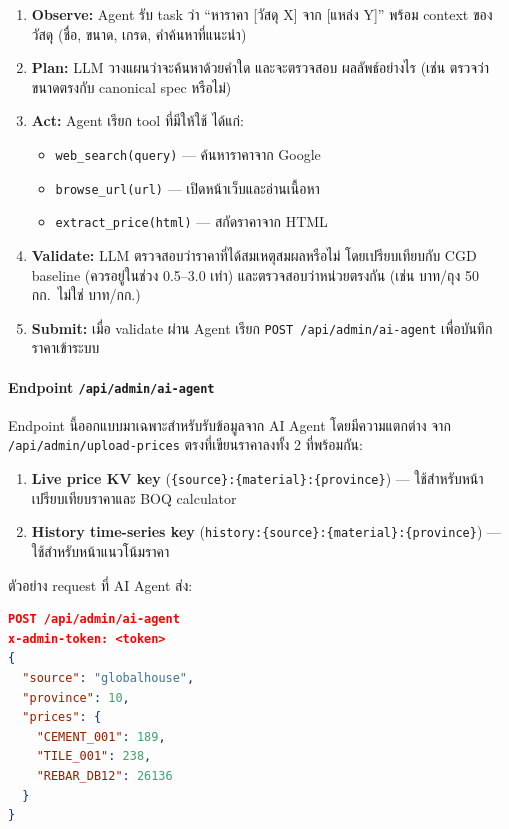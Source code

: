 \begin{enumerate}[leftmargin=2em,itemsep=0.3em]
  \item \textbf{Observe:} Agent รับ task ว่า ``หาราคา [วัสดุ X] จาก
        [แหล่ง Y]'' พร้อม context ของวัสดุ (ชื่อ, ขนาด, เกรด,
        คำค้นหาที่แนะนำ)
  \item \textbf{Plan:} LLM วางแผนว่าจะค้นหาด้วยคำใด และจะตรวจสอบ
        ผลลัพธ์อย่างไร (เช่น ตรวจว่าขนาดตรงกับ canonical spec หรือไม่)
  \item \textbf{Act:} Agent เรียก tool ที่มีให้ใช้ ได้แก่:
        \begin{itemize}[leftmargin=1.5em]
          \item \texttt{web\_search(query)} — ค้นหาราคาจาก Google
          \item \texttt{browse\_url(url)} — เปิดหน้าเว็บและอ่านเนื้อหา
          \item \texttt{extract\_price(html)} — สกัดราคาจาก HTML
        \end{itemize}
  \item \textbf{Validate:} LLM ตรวจสอบว่าราคาที่ได้สมเหตุสมผลหรือไม่
        โดยเปรียบเทียบกับ CGD baseline (ควรอยู่ในช่วง 0.5--3.0 เท่า)
        และตรวจสอบว่าหน่วยตรงกัน (เช่น บาท/ถุง 50 กก.\ ไม่ใช่ บาท/กก.)
  \item \textbf{Submit:} เมื่อ validate ผ่าน Agent เรียก
        \texttt{POST /api/admin/ai-agent} เพื่อบันทึกราคาเข้าระบบ
\end{enumerate}

\paragraph{Endpoint \texttt{/api/admin/ai-agent}}

Endpoint นี้ออกแบบมาเฉพาะสำหรับรับข้อมูลจาก AI Agent โดยมีความแตกต่าง
จาก \texttt{/api/admin/upload-prices} ตรงที่เขียนราคาลงทั้ง 2 ที่พร้อมกัน:

\begin{enumerate}[leftmargin=2em,itemsep=0.2em]
  \item \textbf{Live price KV key} (\texttt{\{source\}:\{material\}:\{province\}})
        — ใช้สำหรับหน้าเปรียบเทียบราคาและ BOQ calculator
  \item \textbf{History time-series key} (\texttt{history:\{source\}:\{material\}:\{province\}})
        — ใช้สำหรับหน้าแนวโน้มราคา
\end{enumerate}

ตัวอย่าง request ที่ AI Agent ส่ง:
\begin{lstlisting}[language=json,caption={ตัวอย่าง request จาก AI Agent}]
POST /api/admin/ai-agent
x-admin-token: <token>
{
  "source": "globalhouse",
  "province": 10,
  "prices": {
    "CEMENT_001": 189,
    "TILE_001": 238,
    "REBAR_DB12": 26136
  }
}
\end{lstlisting}

